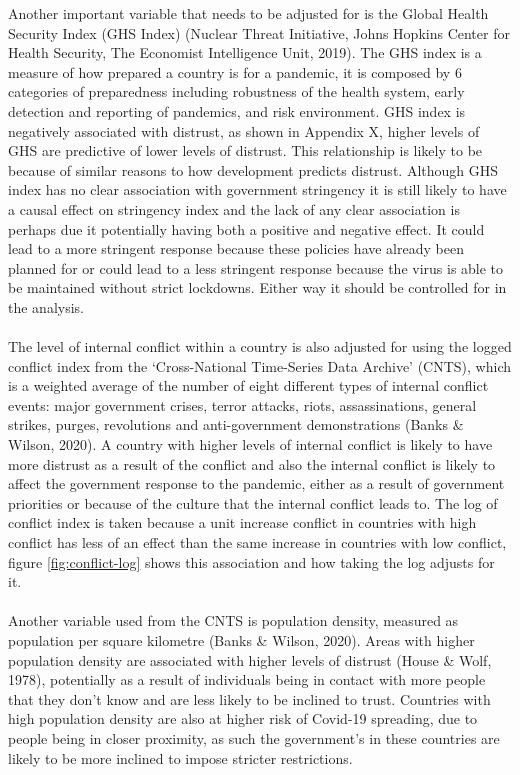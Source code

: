 \documentclass[
  11pt,
]{article}
\begin{document}
Another important variable that needs to be adjusted for is the Global Health Security Index (GHS Index) (Nuclear Threat Initiative, Johns Hopkins Center for Health Security, The Economist Intelligence Unit, 2019). The GHS index is a measure of how prepared a country is for a pandemic, it is composed by 6 categories of preparedness including robustness of the health system, early detection and reporting of pandemics, and risk environment. GHS index is negatively associated with distrust, as shown in Appendix X, higher levels of GHS are predictive of lower levels of distrust. This relationship is likely to be because of similar reasons to how development predicts distrust. Although GHS index has no clear association with government stringency it is still likely to have a causal effect on stringency index and the lack of any clear association is perhaps due it potentially having both a positive and negative effect. It could lead to a more stringent response because these policies have already been planned for or could lead to a less stringent response because the virus is able to be maintained without strict lockdowns. Either way it should be controlled for in the analysis.\\
~\\
The level of internal conflict within a country is also adjusted for using the logged conflict index from the `Cross-National Time-Series Data Archive' (CNTS), which is a weighted average of the number of eight different types of internal conflict events: major government crises, terror attacks, riots, assassinations, general strikes, purges, revolutions and anti-government demonstrations (Banks \& Wilson, 2020). A country with higher levels of internal conflict is likely to have more distrust as a result of the conflict and also the internal conflict is likely to affect the government response to the pandemic, either as a result of government priorities or because of the culture that the internal conflict leads to. The log of conflict index is taken because a unit increase conflict in countries with high conflict has less of an effect than the same increase in countries with low conflict, figure \ref{fig:conflict-log} shows this association and how taking the log adjusts for it.\\
~\\
Another variable used from the CNTS is population density, measured as population per square kilometre (Banks \& Wilson, 2020). Areas with higher population density are associated with higher levels of distrust (House \& Wolf, 1978), potentially as a result of individuals being in contact with more people that they don't know and are less likely to be inclined to trust. Countries with high population density are also at higher risk of Covid-19 spreading, due to people being in closer proximity, as such the government's in these countries are likely to be more inclined to impose stricter restrictions.\\
\end{document}
